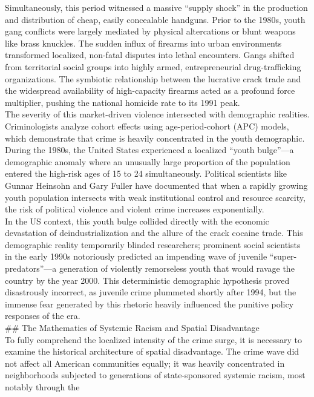 \documentclass[
]{article}
\begin{document}
Simultaneously, this period witnessed a massive ``supply shock'' in the
production and distribution of cheap, easily concealable handguns. Prior
to the 1980s, youth gang conflicts were largely mediated by physical
altercations or blunt weapons like brass knuckles. The sudden influx of
firearms into urban environments transformed localized, non-fatal
disputes into lethal encounters. Gangs shifted from territorial social
groups into highly armed, entrepreneurial drug-trafficking
organizations. The symbiotic relationship between the lucrative crack
trade and the widespread availability of high-capacity firearms acted as
a profound force multiplier, pushing the national homicide rate to its
1991 peak.\\
The severity of this market-driven violence intersected with demographic
realities. Criminologists analyze cohort effects using age-period-cohort
(APC) models, which demonstrate that crime is heavily concentrated in
the youth demographic. During the 1980s, the United States experienced a
localized ``youth bulge''---a demographic anomaly where an unusually
large proportion of the population entered the high-risk ages of 15 to
24 simultaneously. Political scientists like Gunnar Heinsohn and Gary
Fuller have documented that when a rapidly growing youth population
intersects with weak institutional control and resource scarcity, the
risk of political violence and violent crime increases exponentially.\\
In the US context, this youth bulge collided directly with the economic
devastation of deindustrialization and the allure of the crack cocaine
trade. This demographic reality temporarily blinded researchers;
prominent social scientists in the early 1990s notoriously predicted an
impending wave of juvenile ``super-predators''---a generation of
violently remorseless youth that would ravage the country by the year
2000. This deterministic demographic hypothesis proved disastrously
incorrect, as juvenile crime plummeted shortly after 1994, but the
immense fear generated by this rhetoric heavily influenced the punitive
policy responses of the era.\\
\#\# The Mathematics of Systemic Racism and Spatial Disadvantage\\
To fully comprehend the localized intensity of the crime surge, it is
necessary to examine the historical architecture of spatial
disadvantage. The crime wave did not affect all American communities
equally; it was heavily concentrated in neighborhoods subjected to
generations of state-sponsored systemic racism, most notably through the
\end{document}
